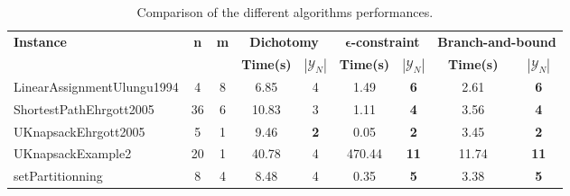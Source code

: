 \begin{table}[!h]
\centering
\hspace*{-1cm}\begin{tabular}{lcccccccc}
\toprule
\textbf{Instance} & \textbf{n} & \textbf{m} & \multicolumn{2}{c}{\textbf{Dichotomy}} & \multicolumn{2}{c}{\textbf{$\mathbf{\epsilon}$-constraint}}  & \multicolumn{2}{c}{\textbf{Branch-and-bound}}
\\
\cmidrule(r){4-5} \cmidrule(r){6-7} \cmidrule(r){8-9}
~ & ~ & ~ & \textbf{Time(s)} & \textbf{$|\mathcal{Y}_N|$} & \textbf{Time(s)} & \textbf{$|\mathcal{Y}_N|$} & \textbf{Time(s)} & \textbf{$|\mathcal{Y}_N|$} \\
\midrule

LinearAssignmentUlungu1994 & 4 & 8 & 6.85 & 4 &  \textcolor{blue2}{1.49} &  \textbf{6} & 2.61 &  \textbf{6} \\
ShortestPathEhrgott2005 & 36 & 6 & 10.83 & 3 &  \textcolor{blue2}{1.11} &  \textbf{4} & 3.56 &  \textbf{4} \\
UKnapsackEhrgott2005 & 5 & 1 & 9.46 &  \textbf{2} &  \textcolor{blue2}{0.05} &  \textbf{2} & 3.45 &  \textbf{2} \\
UKnapsackExample2 & 20 & 1 & 40.78 & 4 & 470.44 &  \textbf{11} &  \textcolor{blue2}{11.74} &  \textbf{11} \\
setPartitionning & 8 & 4 & 8.48 & 4 &  \textcolor{blue2}{0.35} &  \textbf{5} & 3.38 &  \textbf{5} \\
\bottomrule
\end{tabular}
\caption{Comparison of the different algorithms performances.}
\label{tab:table_compare}
\end{table}

